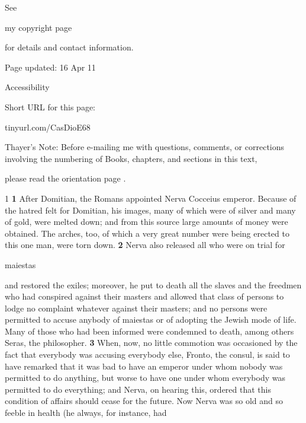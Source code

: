 See

my copyright page

for details and contact information.

Page updated:
16 Apr 11

Accessibility


Short URL for this page:

tinyurl.com/CasDioE68

Thayer's Note: Before e-mailing me with questions, comments, or corrections involving the numbering of Books, chapters, and sections in this text,

please read the orientation page .

1 \textbf{1} After Domitian, the Romans appointed Nerva Cocceius emperor. Because of the hatred felt for Domitian, his images, many of which were of silver and many of gold, were melted down; and from this source large amounts of money were obtained. The arches, too, of which a very great number were being erected to this one man, were torn down. \textbf{2} Nerva also released all who were on trial for

maiestas

and restored the exiles; moreover, he put to death all the slaves and the freedmen who had conspired against their masters and allowed that class of persons to lodge no complaint whatever against their masters; and no persons were permitted to accuse anybody of
maiestas or of adopting the Jewish mode of life. Many of those who had been informed were condemned to death, among others Seras, the philosopher. \textbf{3} When, now, no little commotion was occasioned by the fact that everybody was accusing everybody else, Fronto, the consul, is said to have remarked that it was bad to have an emperor under whom nobody was permitted to do anything, but worse to have one under whom everybody was permitted to do everything; and Nerva, on hearing this, ordered that this condition of affairs should cease for the future. Now Nerva was so old and so feeble in health (he always, for instance, had

